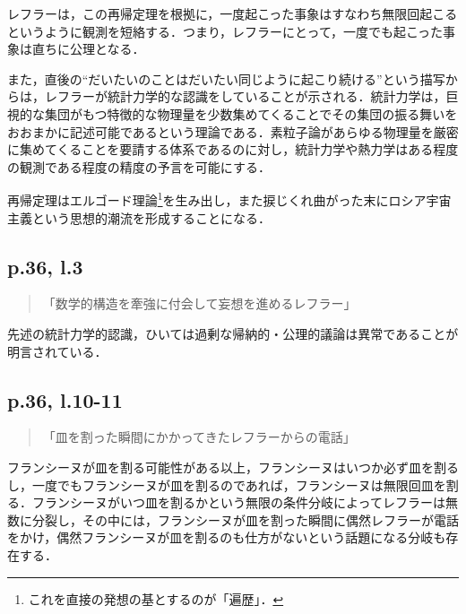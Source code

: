 \documentclass[10pt, a5paper, twoside]{jsarticle}
\theoremstyle{definition}
\begin{document}
                レフラーは，この再帰定理を根拠に，一度起こった事象はすなわち無限回起こるというように観測を短絡する．つまり，レフラーにとって，一度でも起こった事象は直ちに公理となる．

                また，直後の“だいたいのことはだいたい同じように起こり続ける”という描写からは，レフラーが統計力学的な認識をしていることが示される．統計力学は，巨視的な集団がもつ特徴的な物理量を少数集めてくることでその集団の振る舞いをおおまかに記述可能であるという理論である．素粒子論があらゆる物理量を厳密に集めてくることを要請する体系であるのに対し，統計力学や熱力学はある程度の観測である程度の精度の予言を可能にする．

                再帰定理はエルゴード理論\footnote{これを直接の発想の基とするのが「遍歴」．}を生み出し，また捩じくれ曲がった末にロシア宇宙主義という思想的潮流を形成することになる．

            \subsection{p.36, l.3}

                \begin{quote}

                    「数学的構造を牽強に付会して妄想を進めるレフラー」

                \end{quote}

                先述の統計力学的認識，ひいては過剰な帰納的・公理的議論は異常であることが明言されている．

            \subsection{p.36, l.10-11}

                \begin{quote}

                    「皿を割った瞬間にかかってきたレフラーからの電話」

                \end{quote}

                フランシーヌが皿を割る可能性がある以上，フランシーヌはいつか必ず皿を割るし，一度でもフランシーヌが皿を割るのであれば，フランシーヌは無限回皿を割る．フランシーヌがいつ皿を割るかという無限の条件分岐によってレフラーは無数に分裂し，その中には，フランシーヌが皿を割った瞬間に偶然レフラーが電話をかけ，偶然フランシーヌが皿を割るのも仕方がないという話題になる分岐も存在する．
\end{document}
